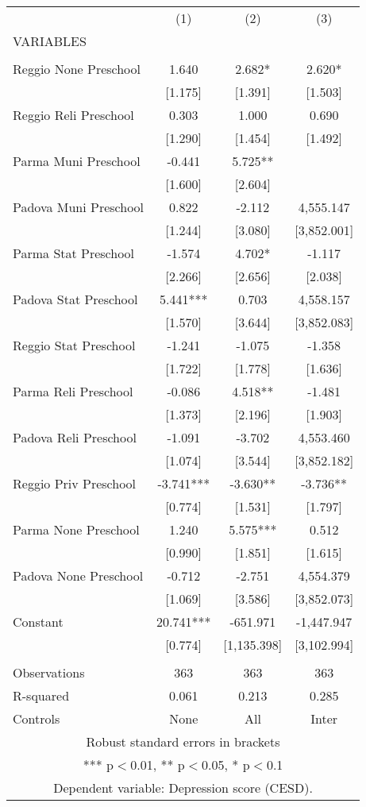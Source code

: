 \begin{tabular}{lccc} \hline
 & (1) & (2) & (3) \\
VARIABLES &  &  &  \\ \hline
 &  &  &  \\
Reggio None Preschool & 1.640 & 2.682* & 2.620* \\
 & [1.175] & [1.391] & [1.503] \\
Reggio Reli Preschool & 0.303 & 1.000 & 0.690 \\
 & [1.290] & [1.454] & [1.492] \\
Parma Muni Preschool & -0.441 & 5.725** &  \\
 & [1.600] & [2.604] &  \\
Padova Muni Preschool & 0.822 & -2.112 & 4,555.147 \\
 & [1.244] & [3.080] & [3,852.001] \\
Parma Stat Preschool & -1.574 & 4.702* & -1.117 \\
 & [2.266] & [2.656] & [2.038] \\
Padova Stat Preschool & 5.441*** & 0.703 & 4,558.157 \\
 & [1.570] & [3.644] & [3,852.083] \\
Reggio Stat Preschool & -1.241 & -1.075 & -1.358 \\
 & [1.722] & [1.778] & [1.636] \\
Parma Reli Preschool & -0.086 & 4.518** & -1.481 \\
 & [1.373] & [2.196] & [1.903] \\
Padova Reli Preschool & -1.091 & -3.702 & 4,553.460 \\
 & [1.074] & [3.544] & [3,852.182] \\
Reggio Priv Preschool & -3.741*** & -3.630** & -3.736** \\
 & [0.774] & [1.531] & [1.797] \\
Parma None Preschool & 1.240 & 5.575*** & 0.512 \\
 & [0.990] & [1.851] & [1.615] \\
Padova None Preschool & -0.712 & -2.751 & 4,554.379 \\
 & [1.069] & [3.586] & [3,852.073] \\
Constant & 20.741*** & -651.971 & -1,447.947 \\
 & [0.774] & [1,135.398] & [3,102.994] \\
 &  &  &  \\
Observations & 363 & 363 & 363 \\
R-squared & 0.061 & 0.213 & 0.285 \\
 Controls & None & All & Inter \\ \hline
\multicolumn{4}{c}{ Robust standard errors in brackets} \\
\multicolumn{4}{c}{ *** p$<$0.01, ** p$<$0.05, * p$<$0.1} \\
\multicolumn{4}{c}{ Dependent variable: Depression score (CESD).} \\
\end{tabular}
